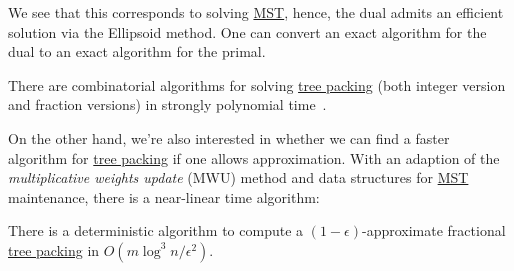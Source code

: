 We see that this corresponds to solving \hyperref[prb:MST]{MST}, hence, the dual admits an efficient solution via the Ellipsoid method. One can convert an exact algorithm for the dual to an exact algorithm for the primal.

\begin{remark}
	There are combinatorial algorithms for solving \hyperref[prb:TP]{tree packing} (both integer version and fraction versions) in strongly polynomial time~\cite{schrijver2003combinatorial}.
\end{remark}

On the other hand, we're also interested in whether we can find a faster algorithm for \hyperref[prb:TP]{tree packing} if one allows approximation. With an adaption of the \emph{multiplicative weights update} (MWU) method and data structures for \hyperref[prb:MST]{MST} maintenance, there is a near-linear time algorithm:

\begin{theorem}\label{thm:approximate-TP}
	There is a deterministic algorithm to compute a \((1 - \epsilon )\)-approximate fractional \hyperref[prb:TP]{tree packing} in \(O(m \log ^3 n / \epsilon ^2)\).
\end{theorem}